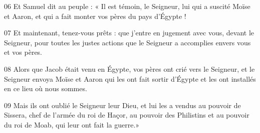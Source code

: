 
06 Et Samuel dit au peuple : « Il est témoin, le Seigneur, lui qui a suscité Moïse et Aaron, et qui a fait monter vos pères du pays d’Égypte !

07 Et maintenant, tenez-vous prêts : que j’entre en jugement avec vous, devant le Seigneur, pour toutes les justes actions que le Seigneur a accomplies envers vous et vos pères.

08 Alors que Jacob était venu en Égypte, vos pères ont crié vers le Seigneur, et le Seigneur envoya Moïse et Aaron qui les ont fait sortir d’Égypte et les ont installés en ce lieu où nous sommes.

09 Mais ils ont oublié le Seigneur leur Dieu, et lui les a vendus au pouvoir de Sissera, chef de l’armée du roi de Haçor, au pouvoir des Philistins et au pouvoir du roi de Moab, qui leur ont fait la guerre.»

